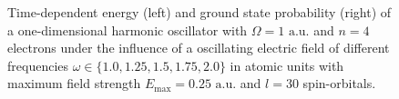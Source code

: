 \begin{figure}[!h]
    \centering
    \caption{Time-dependent energy (left) and ground state probability (right)
        of a one-dimensional harmonic oscillator with $\Omega=1 \text{ a.u.}$
        and $n=4$ electrons under the influence of a oscillating electric field 
        of different frequencies $\omega\in\{1.0, 1.25, 1.5, 1.75, 2.0\}$ in 
        atomic units with maximum field strength $E_\text{max}=0.25 \text{ a.u.}$
        and $l=30$ spin-orbitals.
    }
    \label{fig:1d_n4_qd_resonance}
\end{figure}

